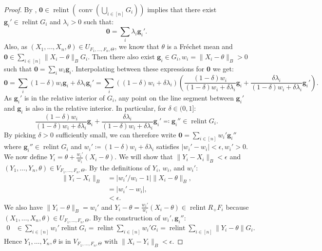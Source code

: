 \documentclass[10pt]{article}
\theoremstyle{definition}
\theoremstyle{remark}
\newcommand{\CType}{F_1,\dots,F_n}
\newcommand{\sample}{ X_1,\dots, X_n}
\DeclareMathOperator{\conv}{conv}
\DeclareMathOperator{\relint}{relint}
\renewcommand{\vec}[1]{\mathbf{#1}}
\begin{document}
\begin{proof}
		By \cite[Theorem 6.9]{rockafellar1970convex}, $\vec 0 \in \relint \left( \conv \left(\textstyle \bigcup_{i \in [n]} G_i \right) \right)$ implies that there exist $\vec g_i' \in \relint G_i$ and $\lambda_i > 0$ such that:
		\[
		\vec 0 = \sum_i \lambda_i \vec g_i'.
		\]
		Also, as $(X_1,\dots, X_n,\theta) \in U_{F_1,\dots, F_n,\Theta}$, we know that $\theta$ is a Fr\'echet mean and $\vec 0 \in \sum_{i \in [n]} \| X_i - \theta \|_B G_i$. Then there also exist $\vec g_i \in G_i, w_i = \|X_i - \theta\|_B > 0$ such that $\vec 0 = \sum_i w_i \vec g_i$.
		Interpolating between these expressions for $\vec 0$ we get:
		\[
		\vec 0 = \sum_i (1-\delta)w_i \vec g_i + \delta \lambda_i \vec g_i' = \sum_i \left((1-\delta)w_i + \delta \lambda_i\right) \left( \frac{(1-\delta)w_i}{(1-\delta)w_i + \delta \lambda_i} \vec g_i + \frac{\delta \lambda_i}{(1-\delta)w_i + \delta \lambda_i} \vec g_i' \right) .
		\]
		As $\vec g_i'$ is in the relative interior of $G_i$, any point on the line segment between $\vec g_i'$ and $\vec g_i$ is also in the relative interior. In particular, for $\delta \in (0,1]$:
		\[
		\frac{(1-\delta)w_i}{(1-\delta)w_i + \delta \lambda_i} \vec g_i + \frac{\delta \lambda_i}{(1-\delta)w_i + \delta \lambda_i} \vec g_i' \eqqcolon \vec g_i'' \in \relint G_i.
		\]
		By picking $\delta >0$ sufficiently small, we can therefore write $\vec 0 = \sum_{i \in [n]} w_i' \vec g_i''$ where $\vec g_i'' \in \relint G_i$ and $w_i' \coloneqq (1-\delta)w_i + \delta \lambda_i$ satisfies $|w_i' - w_i| < \epsilon, w_i'>0$. \\
		We now define $Y_i = \theta + \frac{w_i'}{w_i}(X_i-\theta)$. We will show that $\| Y_i - X_i \|_B < \epsilon$ and $(Y_1, \dots, Y_n,\theta) \in V_{\CType, \Theta}$.
		By the definitions of $Y_i$, $w_i$, and $w_i'$:
		\begin{align*}
			\|Y_i - X_i\|_B &= |w_i'/w_i - 1| \|X_i - \theta\|_B, \\
			&= |w_i' - w_i|, \\
			&< \epsilon.
		\end{align*}
		We also have $\|Y_i - \theta\|_B = w_i'$ and $Y_i - \theta = \tfrac{w_i'}{w_i}(X_i-\theta) \in \relint R_+F_i$ because $(\sample,\theta) \in U_{\CType,\Theta}$.
		By the construction of $w_i', \vec g_i''$:
		\begin{align*}
			0 &\in \textstyle\sum_{i \in [n]} w_i' \relint G_i = \relint \sum_{i \in [n]} w_i' G_i = \relint \sum_{i \in [n]} \|Y_i - \theta\| G_i.
		\end{align*}
		Hence $Y_1,\dots,Y_n,\theta$ is in $V_{\CType,\Theta}$ with $\|X_i-Y_i\|_B < \epsilon$.
	\end{proof}
	
\end{document}
